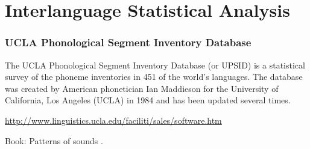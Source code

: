 \documentclass[notes]{beamer}
\begin{document}
\section{Interlanguage Statistical Analysis}
\frame
{
  \frametitle{UCLA Phonological Segment Inventory Database}
  
  The UCLA Phonological Segment Inventory Database (or UPSID) is a statistical survey of the phoneme inventories in 451 of the world's languages. The database was created by American phonetician Ian Maddieson for the University of California, Los Angeles (UCLA) in 1984 and has been updated several times.
  
  \vspace{1cm}
  \url{http://www.linguistics.ucla.edu/faciliti/sales/software.htm}
  
  \vspace{0.25cm}
  Book: Patterns of sounds \citep{maddieson1884}.
}
\end{document}
